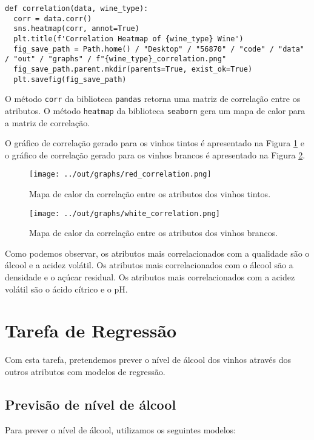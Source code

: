 \documentclass{article}
\begin{document}
\begin{verbatim}
def correlation(data, wine_type):
  corr = data.corr()
  sns.heatmap(corr, annot=True)
  plt.title(f'Correlation Heatmap of {wine_type} Wine')
  fig_save_path = Path.home() / "Desktop" / "56870" / "code" / "data" / "out" / "graphs" / f"{wine_type}_correlation.png"
  fig_save_path.parent.mkdir(parents=True, exist_ok=True)
  plt.savefig(fig_save_path)
\end{verbatim}

O método \texttt{corr} da biblioteca \texttt{pandas} retorna uma matriz de correlação entre os atributos. O método \texttt{heatmap} da biblioteca \texttt{seaborn} gera um mapa de calor para a matriz de correlação.

O gráfico de correlação gerado para os vinhos tintos é apresentado na Figura \ref{fig:corr_red} e o gráfico de correlação gerado para os vinhos brancos é apresentado na Figura \ref{fig:corr_white}.

\begin{figure}[ht]
  \centering
  \texttt{[image: ../out/graphs/red\_correlation.png]}
  \caption{Mapa de calor da correlação entre os atributos dos vinhos tintos.}
  \label{fig:corr_red}
\end{figure}

\begin{figure}[ht]
  \centering
  \texttt{[image: ../out/graphs/white\_correlation.png]}
  \caption{Mapa de calor da correlação entre os atributos dos vinhos brancos.}
  \label{fig:corr_white}
\end{figure}

Como podemos observar, os atributos mais correlacionados com a qualidade são o álcool e a acidez volátil. Os atributos mais correlacionados com o álcool são a densidade e o açúcar residual. Os atributos mais correlacionados com a acidez volátil são o ácido cítrico e o pH.

\section{Tarefa de Regressão}

Com esta tarefa, pretendemos prever o nível de álcool dos vinhos através dos outros atributos com modelos de regressão.

\subsection{Previsão de nível de álcool}
Para prever o nível de álcool, utilizamos os seguintes modelos:
\end{document}
